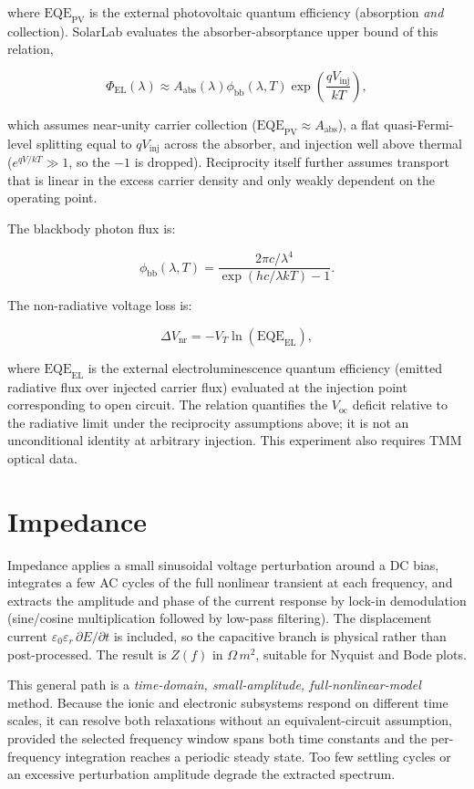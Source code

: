 \documentclass[
  11pt,
  american,
]{report}
\begin{document}
where \(\mathrm{EQE}_\mathrm{PV}\) is the external photovoltaic quantum
efficiency (absorption \emph{and} collection). SolarLab evaluates the
absorber-absorptance upper bound of this relation,

\[
\Phi_\mathrm{EL}(\lambda)
\approx
A_\mathrm{abs}(\lambda)
\phi_\mathrm{bb}(\lambda,T)
\exp\left(\frac{qV_\mathrm{inj}}{kT}\right),
\]

which assumes near-unity carrier collection
(\(\mathrm{EQE}_\mathrm{PV} \approx A_\mathrm{abs}\)), a flat
quasi-Fermi-level splitting equal to \(qV_\mathrm{inj}\) across the
absorber, and injection well above thermal (\(e^{qV/kT} \gg 1\), so the
\(-1\) is dropped). Reciprocity itself further assumes transport that is
linear in the excess carrier density and only weakly dependent on the
operating point.

The blackbody photon flux is:

\[
\phi_\mathrm{bb}(\lambda,T)
=
\frac{2\pi c/\lambda^4}
{\exp(hc/\lambda kT)-1}.
\]

The non-radiative voltage loss is:

\[
\Delta V_\mathrm{nr}
=
-V_T\ln(\mathrm{EQE}_\mathrm{EL}),
\]

where \(\mathrm{EQE}_\mathrm{EL}\) is the external electroluminescence
quantum efficiency (emitted radiative flux over injected carrier flux)
evaluated at the injection point corresponding to open circuit. The
relation quantifies the \(V_\mathrm{oc}\) deficit relative to the
radiative limit under the reciprocity assumptions above; it is not an
unconditional identity at arbitrary injection. This experiment also
requires TMM optical data.

\hypertarget{impedance}{%
\section{Impedance}\label{impedance}}

Impedance applies a small sinusoidal voltage perturbation around a DC
bias, integrates a few AC cycles of the full nonlinear transient at each
frequency, and extracts the amplitude and phase of the current response
by lock-in demodulation (sine/cosine multiplication followed by low-pass
filtering). The displacement current
\(\varepsilon_0\varepsilon_r\,\partial E/\partial t\) is included, so
the capacitive branch is physical rather than post-processed. The result
is \(Z(f)\) in \(\Omega\, m^2\), suitable for Nyquist and Bode plots.

This general path is a \emph{time-domain, small-amplitude,
full-nonlinear-model} method. Because the ionic and electronic
subsystems respond on different time scales, it can resolve both
relaxations without an equivalent-circuit assumption, provided the
selected frequency window spans both time constants and the
per-frequency integration reaches a periodic steady state. Too few
settling cycles or an excessive perturbation amplitude degrade the
extracted spectrum.
\end{document}
